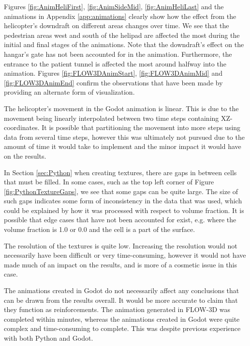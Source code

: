 \documentclass[a4paper,11pt]{extarticle}
\begin{document}
Figures \ref{fig:AnimHeliFirst}, \ref{fig:AnimSideMid}, \ref{fig:AnimHeliLast} and the animations in Appendix \ref{app:animations} clearly show how the effect from the helicopter's downdraft on different areas changes over time. We see that the pedestrian areas west and south of the helipad are affected the most during the initial and final stages of the animations. Note that the downdraft's effect on the hangar's gate has not been accounted for in the animation. Furthermore, the entrance to the patient tunnel is affected the most around halfway into the animation. Figures \ref{fig:FLOW3DAnimStart}, \ref{fig:FLOW3DAnimMid} and \ref{fig:FLOW3DAnimEnd} confirm the observations that have been made by providing an alternate form of visualization.

The helicopter's movement in the Godot animation is linear. This is due to the movement being linearly interpolated between two time steps containing XZ-coordinates. It is possible that partitioning the movement into more steps using data from several time steps, however this was ultimately not pursued due to the amount of time it would take to implement and the minor impact it would have on the results.

In Section \ref{sec:Python} when creating textures, there are gaps in between cells that must be filled. In some cases, such as the top left corner of Figure \ref{fig:PythonTextureGaps}, we see that some gaps can be quite large. The size of such gaps indicates some form of inconsistency in the data that was used, which could be explained by how it was processed with respect to volume fraction. It is possible that edge cases that have not been accounted for exist, e.g. where the volume fraction is 1.0 or 0.0 and the cell is a part of the surface.

The resolution of the textures is quite low. Increasing the resolution would not necessarily have been difficult or very time-consuming, however it would not have made much of an impact on the results, and is more of a cosmetic issue in this case.

The animations created in Godot do not necessarily affect any conclusions that can be drawn from the results overall. It would be more accurate to claim that they function as reinforcements. The animation generated in FLOW-3D was completed within minutes, whereas the animations created in Godot were quite complex and time-consuming to complete. This was despite previous experience with both Python and Godot.
\end{document}
